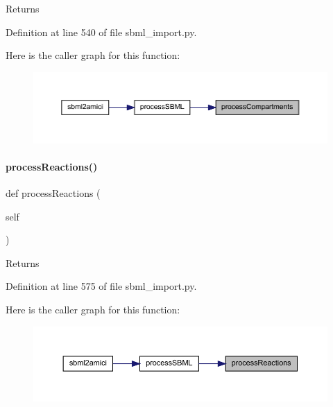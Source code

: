 \begin{DoxyReturn}{Returns}

\end{DoxyReturn}


Definition at line 540 of file sbml\+\_\+import.\+py.

Here is the caller graph for this function\+:
\nopagebreak
\begin{figure}[H]
\begin{center}
\leavevmode
\includegraphics[width=350pt]{classamici_1_1sbml__import_1_1_sbml_importer_a526afc71a857e7fdefb4754fc2f93882_icgraph}
\end{center}
\end{figure}
\mbox{\label{classamici_1_1sbml__import_1_1_sbml_importer_adbdd8e9af99679633109829d94b3fd3e}} 
\paragraph{\texorpdfstring{processReactions()}{processReactions()}}
{\footnotesize\ttfamily def process\+Reactions (\begin{DoxyParamCaption}\item[{}]{self }\end{DoxyParamCaption})}

\begin{DoxyReturn}{Returns}

\end{DoxyReturn}


Definition at line 575 of file sbml\+\_\+import.\+py.

Here is the caller graph for this function\+:
\nopagebreak
\begin{figure}[H]
\begin{center}
\leavevmode
\includegraphics[width=350pt]{classamici_1_1sbml__import_1_1_sbml_importer_adbdd8e9af99679633109829d94b3fd3e_icgraph}
\end{center}
\end{figure}
\mbox{\label{classamici_1_1sbml__import_1_1_sbml_importer_a7df6b4ae4e3e757bc8de5e0cc54fe16b}} 
